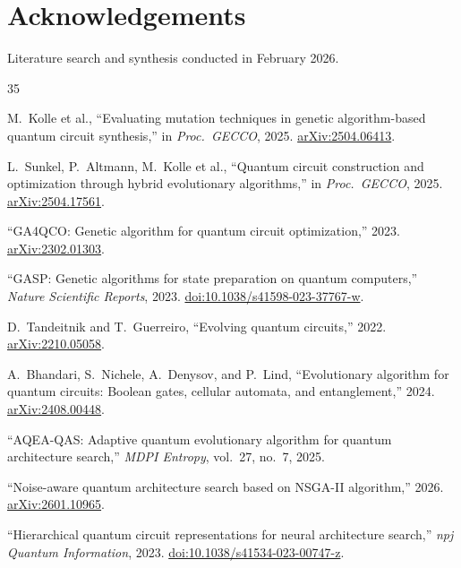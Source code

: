\documentclass[11pt]{article}
\begin{document}
\section*{Acknowledgements}

Literature search and synthesis conducted in February 2026.

\begin{thebibliography}{35}

M.~Kolle et al.,
``Evaluating mutation techniques in genetic algorithm-based quantum circuit synthesis,''
in \emph{Proc.\ GECCO}, 2025.
\newblock \href{https://arxiv.org/abs/2504.06413}{arXiv:2504.06413}.

L.~Sunkel, P.~Altmann, M.~Kolle et al.,
``Quantum circuit construction and optimization through hybrid evolutionary algorithms,''
in \emph{Proc.\ GECCO}, 2025.
\newblock \href{https://arxiv.org/abs/2504.17561}{arXiv:2504.17561}.

``GA4QCO: Genetic algorithm for quantum circuit optimization,''
2023.
\newblock \href{https://arxiv.org/abs/2302.01303}{arXiv:2302.01303}.

``GASP: Genetic algorithms for state preparation on quantum computers,''
\emph{Nature Scientific Reports}, 2023.
\newblock \href{https://www.nature.com/articles/s41598-023-37767-w}{doi:10.1038/s41598-023-37767-w}.

D.~Tandeitnik and T.~Guerreiro,
``Evolving quantum circuits,''
2022.
\newblock \href{https://arxiv.org/abs/2210.05058}{arXiv:2210.05058}.

A.~Bhandari, S.~Nichele, A.~Denysov, and P.~Lind,
``Evolutionary algorithm for quantum circuits: Boolean gates, cellular automata, and entanglement,''
2024.
\newblock \href{https://arxiv.org/abs/2408.00448}{arXiv:2408.00448}.

``AQEA-QAS: Adaptive quantum evolutionary algorithm for quantum architecture search,''
\emph{MDPI Entropy}, vol.~27, no.~7, 2025.

``Noise-aware quantum architecture search based on NSGA-II algorithm,''
2026.
\newblock \href{https://arxiv.org/abs/2601.10965}{arXiv:2601.10965}.

``Hierarchical quantum circuit representations for neural architecture search,''
\emph{npj Quantum Information}, 2023.
\newblock \href{https://www.nature.com/articles/s41534-023-00747-z}{doi:10.1038/s41534-023-00747-z}.


\end{thebibliography}
\end{document}
